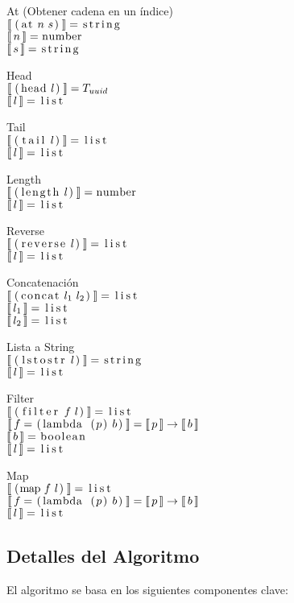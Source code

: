 \documentclass{article}
\newcommand{\cd}[1]{\text{\lstinline[columns=fixed]{#1}}}
\newcommand{\lbr}{\llbracket}
\newcommand{\rbr}{\rrbracket}
\newcommand{\typx}[1]{\lbr\, #1 \,\rbr}
\begin{document}
  At (Obtener cadena en un índice)\\
  $\typx{\cd{(at}\ n\ s\cd{)}} = \cd{string}$\\
  $\typx{n} = \cd{number}$\\
  $\typx{s} = \cd{string}$

  Head\\
  $\typx{\cd{(head}\ l\cd{)}} = T_{uuid}$\\
  $\typx{l} = \cd{list}$

  Tail\\
  $\typx{\cd{(tail}\ l\cd{)}} = \cd{list}$\\
  $\typx{l} = \cd{list}$

  Length\\
  $\typx{\cd{(length}\ l\cd{)}} = \cd{number}$\\
  $\typx{l} = \cd{list}$

  Reverse\\
  $\typx{\cd{(reverse}\ l\cd{)}} = \cd{list}$\\
  $\typx{l} = \cd{list}$

  Concatenación\\
  $\typx{\cd{(concat}\ l_1\ l_2\cd{)}} = \cd{list}$\\
  $\typx{l_1} = \cd{list}$\\
  $\typx{l_2} = \cd{list}$

  Lista a String\\
  $\typx{\cd{(lstostr}\ l\cd{)}} = \cd{string}$\\
  $\typx{l} = \cd{list}$

  Filter\\
  $\typx{\cd{(filter}\ f\ l\cd{)}} = \cd{list}$\\
  $\typx{f = \cd{(lambda (}p\cd{)}\ b\cd{)}} = \typx{p} \rightarrow \typx{b}$\\
  $\typx{b} = \cd{boolean}$\\
  $\typx{l} = \cd{list}$

  Map\\
  $\typx{\cd{(map}\ f\ l\cd{)}} = \cd{list}$\\
  $\typx{f = \cd{(lambda (}p\cd{)}\ b\cd{)}} = \typx{p} \rightarrow \typx{b}$\\
  $\typx{l} = \cd{list}$


  \subsection{Detalles del Algoritmo}

  El algoritmo se basa en los siguientes componentes clave:
\end{document}
